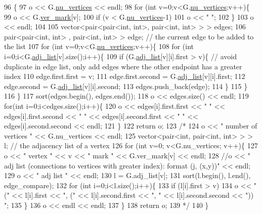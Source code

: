 \begin{DoxyCode}
96 \{
97   o << G.\hyperlink{classmarked__graph_acf79c6aeb8f32614cb14a5baaa6c9f9b}{nu\_vertices} << endl;
98   \textcolor{keywordflow}{for} (\textcolor{keywordtype}{int} v=0;v<G.\hyperlink{classmarked__graph_acf79c6aeb8f32614cb14a5baaa6c9f9b}{nu\_vertices};v++)\{
99     o << G.\hyperlink{classmarked__graph_ac83e9377dd4d8bb95be1ac949b127296}{ver\_mark}[v];
100     \textcolor{keywordflow}{if} (v < G.\hyperlink{classmarked__graph_acf79c6aeb8f32614cb14a5baaa6c9f9b}{nu\_vertices}-1)
101       o << \textcolor{stringliteral}{" "};
102   \}
103   o << endl;
104 
105   vector<pair<pair<int, int>, pair<int, int> > > edges;
106   pair<pair<int, int> , pair<int, int> > edge; \textcolor{comment}{// the current edge to be added to the list}
107   \textcolor{keywordflow}{for} (\textcolor{keywordtype}{int} v=0;v<G.\hyperlink{classmarked__graph_acf79c6aeb8f32614cb14a5baaa6c9f9b}{nu\_vertices};v++)\{
108     \textcolor{keywordflow}{for} (\textcolor{keywordtype}{int} i=0;i<G.\hyperlink{classmarked__graph_a1a0bf7ca413a278763f7c878b3b6fd6f}{adj\_list}[v].size();i++)\{
109       \textcolor{keywordflow}{if} (G.\hyperlink{classmarked__graph_a1a0bf7ca413a278763f7c878b3b6fd6f}{adj\_list}[v][i].first > v)\{ \textcolor{comment}{// avoid duplicate in edge list, only add edges where the
       other endpoint has a greater index}
110         edge.first.first = v;
111         edge.first.second = G.\hyperlink{classmarked__graph_a1a0bf7ca413a278763f7c878b3b6fd6f}{adj\_list}[v][i].first;
112         edge.second = G.\hyperlink{classmarked__graph_a1a0bf7ca413a278763f7c878b3b6fd6f}{adj\_list}[v][i].second;
113         edges.push\_back(edge);
114       \}
115     \}
116   \}
117   sort(edges.begin(), edges.end());
118   o << edges.size() << endl;
119   \textcolor{keywordflow}{for}(\textcolor{keywordtype}{int} i=0;i<edges.size();i++)\{
120     o << edges[i].first.first << \textcolor{stringliteral}{" "} << edges[i].first.second << \textcolor{stringliteral}{" "} << edges[i].second.first << \textcolor{stringliteral}{" "} << 
      edges[i].second.second << endl;
121   \}
122   \textcolor{keywordflow}{return} o;
123   \textcolor{comment}{/*}
124 \textcolor{comment}{  o << " number of vertices " << G.nu\_vertices << endl;}
125 \textcolor{comment}{  vector<pair<int, pair<int, int> > > l; // the adjacency list of a vertex}
126 \textcolor{comment}{  for (int v=0; v<G.nu\_vertices; v++)\{}
127 \textcolor{comment}{    o << " vertex " << v << " mark " << G.ver\_mark[v] << endl;}
128 \textcolor{comment}{    //o << " adj list (connections to vertices with greater index): format (j, (x,y))" << endl;}
129 \textcolor{comment}{    o << " adj list " << endl;}
130 \textcolor{comment}{    l = G.adj\_list[v];}
131 \textcolor{comment}{    sort(l.begin(), l.end(), edge\_compare);}
132 \textcolor{comment}{    for (int i=0;i<l.size();i++)\{}
133 \textcolor{comment}{      if (l[i].first > v)}
134 \textcolor{comment}{        o << " (" << l[i].first << ", (" << l[i].second.first << ", " << l[i].second.second << ")) ";}
135 \textcolor{comment}{    \}}
136 \textcolor{comment}{    o << endl << endl;}
137 \textcolor{comment}{  \}}
138 \textcolor{comment}{  return o;}
139 \textcolor{comment}{  */}
140 \}
\end{DoxyCode}
